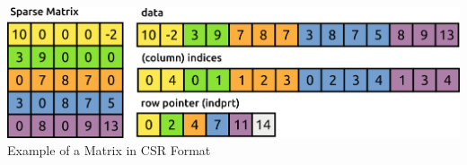 \begin{center}
		\includegraphics[width=0.8\linewidth]{csr-matrix}\\
		Example of a Matrix in CSR Format
\end{center}

